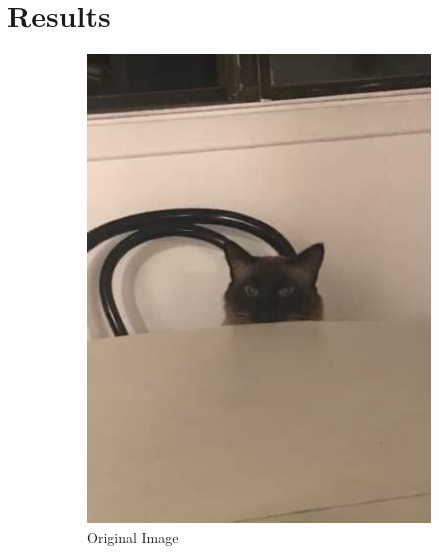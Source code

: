 \documentclass[12pt, letterpaper]{article}
\begin{document}
\section{Results}
\begin{figure}[H]
  \centering
  \begin{subfigure}[b]{.3\textwidth}
  \includegraphics[width=\textwidth]{../imgs/stare}
  \caption{Original Image}
  \label{fig:5}
\end{subfigure}\\
  \begin{subfigure}[b]{.4\textwidth}
  \centering

\end{subfigure}
\end{figure}
\end{document}
